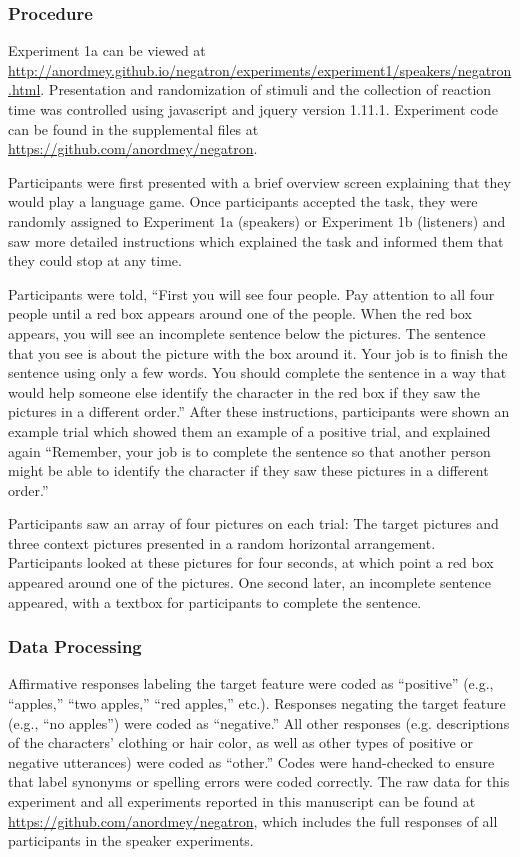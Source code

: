 \documentclass[man, floatsintext, noapacite]{apa6}
\begin{document}
\subsubsection{Procedure}

Experiment 1a can be viewed at \url{http://anordmey.github.io/negatron/experiments/experiment1/speakers/negatron.html}. Presentation and randomization of stimuli and the collection of reaction time was controlled using javascript and jquery version 1.11.1. Experiment code can be found in the supplemental files at  \url{https://github.com/anordmey/negatron}.

 Participants were first presented with a brief overview screen explaining that they would play a language game.  Once participants accepted the task, they were randomly assigned to Experiment 1a (speakers) or Experiment 1b (listeners) and saw more detailed instructions which explained the task and informed them that they could stop at any time. 

Participants were told, ``First you will see four people. Pay attention to all four people until a red box appears around one of the people. When the red box appears, you will see an incomplete sentence below the pictures. The sentence that you see is about the picture with the box around it. Your job is to finish the sentence using only a few words. You should complete the sentence in a way that would help someone else identify the character in the red box if they saw the pictures in a different order.'' After these instructions, participants were shown an example trial which showed them an example of a positive trial, and explained again ``Remember, your job is to complete the sentence so that another person might be able to identify the character if they saw these pictures in a different order.''

Participants saw an array of four pictures on each trial: The target pictures and three context pictures presented in a random horizontal arrangement.  Participants looked at these pictures for four seconds, at which point a red box appeared around one of the pictures.  One second later, an incomplete sentence appeared, with a textbox for participants to complete the sentence. 

\subsubsection{Data Processing} 

Affirmative responses labeling the target feature were coded as ``positive'' (e.g., ``apples,'' ``two apples,'' ``red apples,'' etc.).  Responses negating the target feature (e.g., ``no apples'') were coded as ``negative.''  All other responses (e.g. descriptions of the characters' clothing or hair color, as well as other types of positive or negative utterances) were coded as ``other.''   Codes were hand-checked to ensure that label synonyms or spelling errors were coded correctly. The raw data for this experiment and all experiments reported in this manuscript can be found at \url{https://github.com/anordmey/negatron}, which includes the full responses of all participants in the speaker experiments. 
\end{document}
